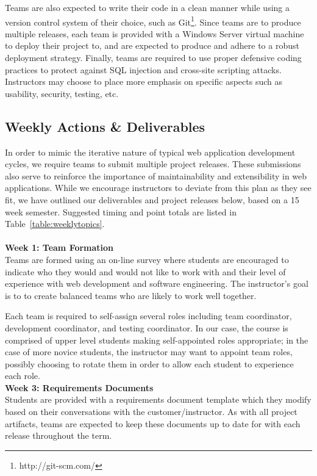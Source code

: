 \documentclass[conference]{IEEEtran}
\begin{document}
Teams are also expected to write their code in a clean manner while using a version control system of their choice, such as Git\footnote{http://git-scm.com/}. Since teams are to produce multiple releases, each team is provided with a Windows Server virtual machine to deploy their project to, and are expected to produce and adhere to a robust deployment strategy. Finally, teams are required to use proper defensive coding practices to protect against SQL injection and cross-site scripting attacks. Instructors may choose to place more emphasis on specific aspects such as usability, security, testing, etc.


\subsection{Weekly Actions \& Deliverables}
In order to mimic the iterative nature of typical web application development cycles, we require teams to submit multiple project releases. These submissions also serve to reinforce the importance of maintainability and extensibility in web applications. While we encourage instructors to deviate from this plan as they see fit, we have outlined our deliverables and project releases below, based on a 15 week semester.  Suggested timing and point totals are listed in Table~\ref{table:weeklytopics}.\\ \\


\textbf{Week 1: Team Formation}\\
Teams are formed using an on-line survey where students are encouraged to indicate who they would and would not like to work with and their level of experience with web development and software engineering.  The instructor's goal is to to create balanced teams who are likely to work well together.

Each team is required to self-assign several roles including team coordinator, development coordinator, and testing coordinator. In our case, the course is comprised of upper level students making self-appointed roles appropriate; in the case of more novice students, the instructor may want to appoint team roles, possibly choosing to rotate them in order to allow each student to experience each role.
 \\

\textbf{Week 3: Requirements Documents}\\
Students are provided with a requirements document template which they modify based on their conversations with the customer/instructor. As with all project artifacts, teams are expected to keep these documents up to date for with each release throughout the term.
\end{document}
